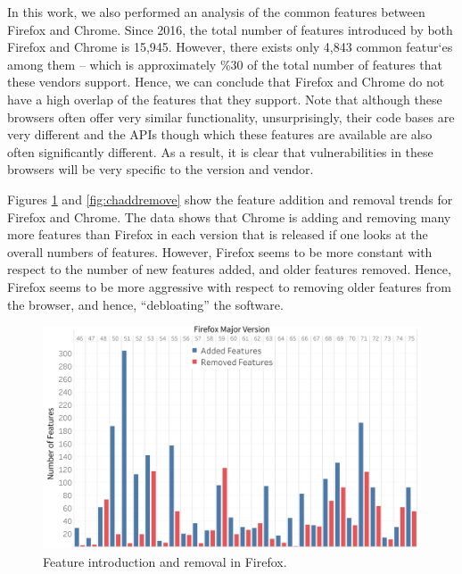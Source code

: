   In this work, we also performed an analysis of the common features
  between Firefox and Chrome. Since 2016, the total number of features
  introduced by both Firefox and Chrome is 15,945. However, there
  exists only 4,843 common featur`es among them -- which is
  approximately \%30 of the total number of features that these
  vendors support. Hence, we can conclude that Firefox and Chrome do
  not have a high overlap of the features that they support. Note that
  although these browsers often offer very similar functionality,
  unsurprisingly, their code bases are very different and the APIs
  though which these features are available are also often
  significantly different. As a result, it is clear that
  vulnerabilities in these browsers will be very specific to the
  version and vendor.

  Figures \ref{fig:ffaddremove} and \ref{fig:chaddremove} show the
  feature addition and removal trends for Firefox and Chrome. The data
  shows that Chrome is adding and removing many more features than
  Firefox in each version that is released if one looks at the overall
  numbers of features. However, Firefox seems to be more constant with
  respect to the number of new features added, and older features
  removed. Hence, Firefox seems to be more aggressive with respect to
  removing older features from the browser, and hence, ``debloating''
  the software.

\begin{figure}[ht]
    \centering
    \includegraphics[width=\columnwidth]{figures/Firefox-add-remove.png}
    \caption{Feature introduction and removal in Firefox.}
    \label{fig:ffaddremove}
\end{figure}


